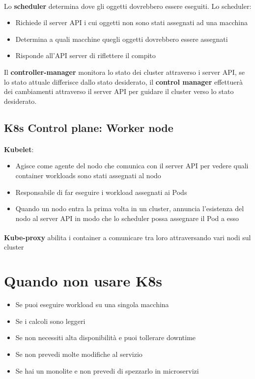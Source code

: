 \documentclass[a4paper, 12pt]{report}
\begin{document}
          \paragraph{}Lo \textbf{scheduler} determina dove gli oggetti dovrebbero essere eseguiti. Lo scheduler:
          \begin{itemize}
            \item Richiede il server API i cui oggetti non sono stati assegnati ad una macchina
            \item Determina a quali macchine quegli oggetti dovrebbero essere assegnati
            \item Risponde all'API server di riflettere il compito
          \end{itemize}
          Il \textbf{controller-manager} monitora lo stato dei cluster attraverso i server API, se lo stato attuale differisce dallo stato desiderato, il \textbf{control manager} 
          effettuerà dei cambiamenti attraverso il server API per guidare il cluster verso lo stato desiderato.
          \subsection{K8s Control plane: Worker node}
          \paragraph{}\textbf{Kubelet}:
          \begin{itemize}
            \item Agisce come agente del nodo che comunica con il server API per vedere quali container workloads sono stati assegnati al nodo
            \item Responsabile di far eseguire i workload assegnati ai Pods
            \item Quando un nodo entra la prima volta in un cluster, annuncia l'esistenza del nodo al server API in modo che lo scheduler possa assegnare il Pod a esso
          \end{itemize}
          \paragraph{}\textbf{Kube-proxy} abilita i container a comunicare tra loro attraversando vari nodi sul cluster
          \section{Quando non usare K8s}
          \begin{itemize}
            \item Se puoi eseguire workload su una singola macchina
            \item Se i calcoli sono leggeri
            \item Se non necessiti alta disponibilità e puoi tollerare downtime
            \item Se non prevedi molte modifiche al servizio 
            \item Se hai un monolite e non prevedi di spezzarlo in microservizi
          \end{itemize}
\end{document}
